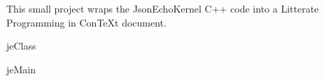 
\begintext

This small project wraps the JsonEchoKernel C++ code into a Litterate 
Programming in ConTeXt document.

\component jeClass

\component jeMain

\endtext
